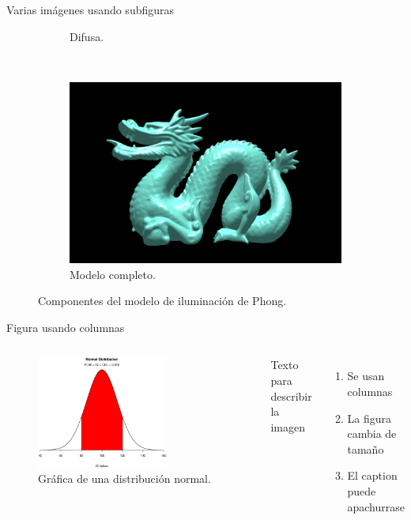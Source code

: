 \begin{frame}{Varias imágenes usando subfiguras}
\begin{figure}[htp]
\begin{subfigure}[b]{0.17\textwidth}
   \caption{Difusa.}
   \label{fig:2c}
 \end{subfigure}
\\
 \begin{subfigure}[b]{0.22\textwidth}
   \includegraphics[width=\textwidth]{img/completo}
   \caption{Modelo completo.}
   \label{fig:2d}
 \end{subfigure}
  \caption{Componentes del modelo de iluminación de Phong.}
  \label{fig:two}
\end{figure}
\end{frame}

\begin{frame}{Figura usando columnas}
\begin{columns}
 \begin{figure}[htb]
  \centering
  \includegraphics[width=0.7\textwidth]{img/normal}
\caption{Gráfica de una distribución normal.}
\end{figure}    
     Texto para describir la imagen
     \begin{enumerate}
         \item Se usan columnas
         \item La figura cambia de tamaño
         \item El caption puede apachurrase
     \end{enumerate}
\end{columns}
\end{frame}

